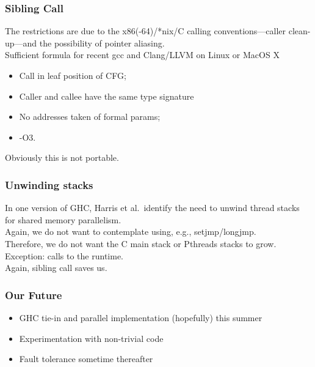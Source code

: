 \documentclass{beamer}
\begin{document}
\begin{frame}
\frametitle{Sibling Call}
The restrictions are due to the x86(-64)/*nix/C calling
conventions---caller clean-up---and the possibility of pointer aliasing.
\\\vspace{0.1in}
Sufficient formula for recent gcc and Clang/LLVM on Linux or MacOS X
\begin{itemize}
\item Call in leaf position of CFG;
\item Caller and callee have the same type signature
\item No addresses taken of formal params;
\item -O3.
\end{itemize}
Obviously this is not portable.
\end{frame}


\begin{frame}
\frametitle{Unwinding stacks}
In one version of GHC, Harris et al.\ identify the need to unwind thread stacks for shared
memory parallelism.
\\\vspace{0.1in}
Again, we do not want to contemplate using, e.g., setjmp/longjmp.
\\\vspace{0.1in}
Therefore, we do not want the C main stack or Pthreads stacks to grow.
\\\vspace{0.1in}
Exception:  calls to the runtime.
\\\vspace{0.1in}
Again, sibling call saves us.
\end{frame}


\begin{frame}
  \frametitle{Our Future}
  
  \begin{itemize}
  \item<1-> GHC tie-in and parallel implementation (hopefully) this summer
  \item<2-> Experimentation with non-trivial code
  \item<3-> Fault tolerance sometime thereafter
  \end{itemize}
   
\end{frame}
\end{document}
